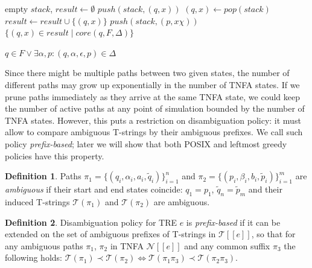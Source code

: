 \documentclass{article}
\newcommand{\Xset}{\!\leftarrow\!}
\newcommand{\Xin}{\!\in\!}
\newcommand{\Xeq}{\!=\!}
\newcommand{\Xlb}{[\![}
\newcommand{\Xrb}{]\!]}
\newcommand{\XN}{\mathcal{N}}
\newcommand{\XT}{\mathcal{T}}
\theoremstyle{definition}
\newtheorem{Xdef}{Definition}
\begin{document}
\begin{multicols}{2}
    \begin{algorithm}[H] \DontPrintSemicolon {} 
     {
        empty $stack$, $result \Xset \emptyset$ \;
        \For {$(q, x) \Xin X:$} {
            $push(stack, (q, x))$ \;
        }
         {
            $(q, x) \Xset pop(stack)$ \;
            $result \Xset result \cup \{(q, x)\}$ \;
            \ForEach {outgoing arc $(q, \epsilon, \chi, p) \Xin \Delta$} {
                \If {$\not \exists (\widetilde{p}, \widetilde{x})$ on stack $: \widetilde{p} \Xeq p$} {
                    $push(stack, (p, x \chi))$ \;
                }
            }
        }
        \Return $\{ (q, x) \Xin result \mid core(q, F, \Delta) \}$ \;
    }
    \end{algorithm}

    \begin{algorithm}[H] \DontPrintSemicolon {} 
     {
        \Return $q \Xin F \vee \exists \alpha, p: (q, \alpha, \epsilon, p) \Xin \Delta$
    }
    \end{algorithm}

Since there might be multiple paths between two given states,
the number of different paths may grow up exponentially in the number of TNFA states.
If we prune paths immediately as they arrive at the same TNFA state,
we could keep the number of active paths at any point of simulation bounded by the number of TNFA states.
However, this puts a restriction on disambiguation policy:
it must allow to compare ambiguous T-strings by their ambiguous prefixes.
We call such policy \emph{prefix-based};
later we will show that both POSIX and leftmost greedy policies have this property.

    \begin{Xdef}
    Paths
    $\pi_1 \Xeq \{(q_i, \alpha_i, a_i, \widetilde{q}_i)\}_{i=1}^n$ and
    $\pi_2 \Xeq \{(p_i, \beta_i, b_i, \widetilde{p}_i)\}_{i=1}^m$
    are \emph{ambiguous} if their start and end states coincide: $q_1 \Xeq p_1$, $\widetilde{q}_n \Xeq \widetilde{p}_m$
    and their induced T-strings $\XT(\pi_1)$ and $\XT(\pi_2)$ are ambiguous.
    \end{Xdef}

    \begin{Xdef}
    Disambiguation policy for TRE $e$ is \emph{prefix-based}
    if it can be extended on the set of ambiguous prefixes of T-strings in $\XT \Xlb e \Xrb$,
    so that for any ambiguous paths $\pi_1 $, $\pi_2 $ in TNFA $\XN \Xlb e \Xrb$
    and any common suffix $\pi_3$ the following holds:
    $\XT(\pi_1) \prec \XT(\pi_2) \Leftrightarrow \XT(\pi_1 \pi_3) \prec \XT(\pi_2 \pi_3)$.
    \end{Xdef}


\end{multicols}
\end{document}
